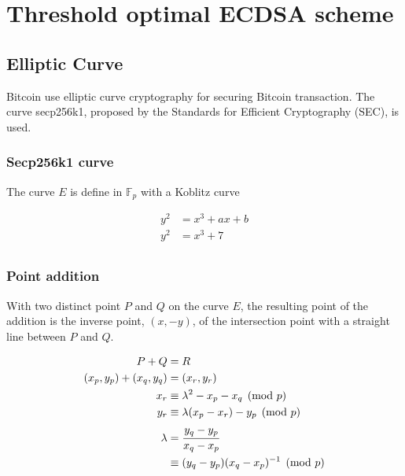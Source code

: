 \chapter{Threshold optimal ECDSA scheme}
\label{chap:threshold-scheme}

\lipsum[1-2]

\minitoc

\newpage

\section{Elliptic Curve}
Bitcoin use elliptic curve cryptography for securing Bitcoin transaction. The curve
secp256k1, proposed by the Standards for Efficient Cryptography (SEC), is used.

\subsection{Secp256k1 curve}
The curve $E$ is define in $\mathbb{F}_p$ with a Koblitz curve

\begin{equation*}
\begin{split}
  y^2 &= x^3 + ax + b\\
  y^2 &= x^3 + 7\\
\end{split}
\end{equation*}

\subsection{Point addition}
With two distinct point $P$ and $Q$ on the curve $E$, the resulting point of the
addition is the inverse point, $(x, -y)$, of the intersection point with a straight
line between $P$ and $Q$.

\begin{equation*}
\begin{split}
  P + Q &= R \\
  (x_p, y_p) + (x_q, y_q) &= (x_r, y_r) \\
  x_r &\equiv \lambda^2 - x_p - x_q \pmod p \\
  y_r &\equiv \lambda(x_p - x_r) - y_p \pmod p  \\
  \lambda &= \cfrac{y_q - y_p}{x_q - x_p} \\
          &\equiv (y_q - y_p)(x_q - x_p)^{-1} \pmod p
\end{split}
\end{equation*}

